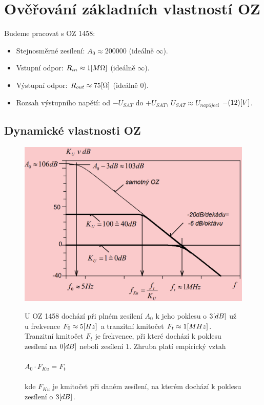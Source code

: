 \documentclass{article}
\newcounter{obrazky}
\newcommand \obrlabel[1]
{ 
  obr.~\theobrazky
  \stepcounter{obrazky}
  \label{#1}
}
\begin{document}
\section{Ověřování základních vlastností OZ}
Budeme pracovat s OZ 1458:
\begin{itemize}
  \item Stejnosměrné zesílení: \(A_0 \approx  200000\) (ideálně \(\infty \)).
  \item Vstupní odpor: \(R_{in} \approx 1\-[M\Omega]\) (ideálně \(\infty \)).
  \item Výstupní odpor: \(R_{out} \approx 75\-[\Omega]\) (ideálně \(0\)).
  \item Rozsah výstupního napětí: od \(-U_{SAT}\) do \(+U_{SAT}\), \(U_{SAT} \approx U_{napájecí}\) \(-(1 2)\-[V]\).
\end{itemize}
\subsection*{Dynamické vlastnosti OZ} 
\begin{figure}[H]
  \begin{minipage}[t]{0.49\textwidth}
    \includegraphics[width=\textwidth]{priprava/sirka_pasma.png}
  \end{minipage}
  \hfill
  \begin{minipage}[t]{0.49\textwidth}
    \vspace{-0.6\textwidth}
    U OZ 1458 dochází při plném zesílení \(A_0\) k jeho poklesu o \(3\-[dB]\) už u frekvence \( F_0 \approx 5\-[Hz]\) a tranzitní kmitočet \(F_t \approx 1\-[MHz]\).
    Tranzitní kmitočet \(F_t\) je frekvence, při které dochází k poklesu zesílení na \(0\-[dB]\) neboli zesílení \(1\).
    Zhruba platí empirický vztah \\
    \\
    \(A_0 \cdot F_{Ku} = F_t\) \\
    \\
    kde \(F_{Ku}\) je kmitočet při daném zesílení, na kterém dochází k poklesu zesílení o \(3\-[dB]\).
  \end{minipage}
\end{figure}
\end{document}
